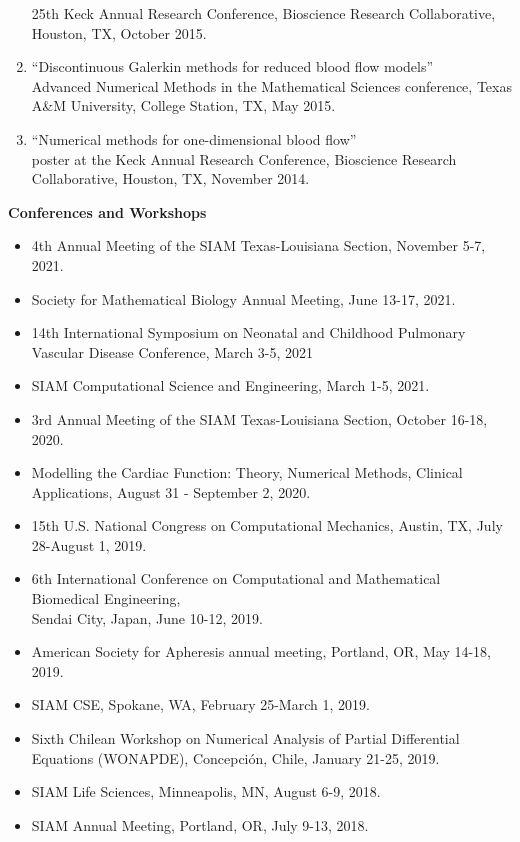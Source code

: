 \documentclass{article} %
\begin{document}
\begin{enumerate}
25th Keck Annual Research Conference, Bioscience Research Collaborative, Houston, TX,  October 2015.
\item ``Discontinuous Galerkin methods for reduced blood flow models'' \\
Advanced Numerical Methods in the Mathematical Sciences conference, Texas A\&M University, College Station, TX, May 2015.
\item ``Numerical methods for one-dimensional blood flow'' \\
poster at the Keck Annual Research Conference, Bioscience Research Collaborative, Houston, TX, November 2014. 
\end{enumerate}

\vspace{0.5cm}
\noindent
{\bf \large Conferences and Workshops}
\begin{itemize}
\item 4th Annual Meeting of the SIAM Texas-Louisiana Section, November 5-7, 2021. 
\item Society for Mathematical Biology Annual Meeting, June 13-17, 2021.
\item 14th International Symposium on Neonatal and Childhood Pulmonary Vascular Disease Conference, March 3-5, 2021
\item SIAM Computational Science and Engineering, March 1-5, 2021.
\item 3rd Annual Meeting of the SIAM Texas-Louisiana Section, October 16-18, 2020. 
\item Modelling the Cardiac Function: Theory, Numerical Methods, Clinical Applications, August 31 - September 2, 2020.
\item 15th U.S. National Congress on Computational Mechanics, Austin, TX, July 28-August 1, 2019.
\item 6th International Conference on Computational and Mathematical Biomedical Engineering,\\ Sendai City, Japan, June 10-12, 2019.
\item American Society for Apheresis annual meeting, Portland, OR, May 14-18, 2019.
\item SIAM CSE, Spokane, WA, February 25-March 1, 2019.
\item Sixth Chilean Workshop on Numerical Analysis of Partial Differential Equations (WONAPDE), Concepci\'on, Chile, January 21-25, 2019.
\item SIAM Life Sciences, Minneapolis, MN, August 6-9, 2018.
\item SIAM Annual Meeting, Portland, OR, July 9-13, 2018.

\end{itemize}
\end{document}
